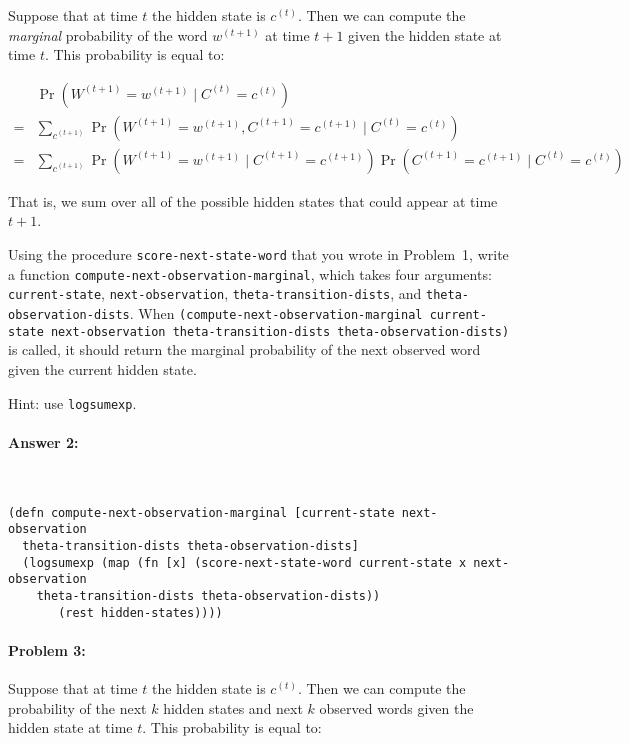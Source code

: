 \documentclass[12pt, letterpaper]{article}
\begin{document}
Suppose that at time $t$ the hidden state is $c^{(t)}$. Then we can
compute the \emph{marginal} probability of the word $w^{(t+1)}$ at
time $t+1$ given the hidden state at time $t$. This probability is
equal to:

\begin{align*}
&\Pr(W^{(t+1)} = w^{(t+1)} \mid C^{(t)} = c^{(t)}) \\ 
=&\sum_{c^{(t+1)}} \Pr(W^{(t+1)} = w^{(t+1)}, C^{(t+1)} =c^{(t+1)} \mid C^{(t)} = c^{(t)})\\
=&\sum_{c^{(t+1)}} \Pr(W^{(t+1)} = w^{(t+1)} \mid C^{(t+1)}=c^{(t+1)}) \Pr(C^{(t+1)} =c^{(t+1)} \mid C^{(t)} = c^{(t)})
\end{align*}

That is, we sum over all of the possible hidden states that could
appear at time $t+1$.

Using the procedure \texttt{score-next-state-word} that you wrote in
Problem~1, write a function
\texttt{compute-next-observation-marginal}, which takes four
arguments: \texttt{current-state}, \texttt{next-observation},
\texttt{theta-transition-dists}, and
\texttt{theta-observation-dists}. When
\texttt{(compute-next-observation-marginal current-state
  next-observation theta-transition-dists theta-observation-dists)} is
called, it should return the marginal probability of the next observed
word given the current hidden state.

Hint: use \texttt{logsumexp}. 

\paragraph{Answer 2:}~\begin{lstlisting}
(defn compute-next-observation-marginal [current-state next-observation 
  theta-transition-dists theta-observation-dists]
  (logsumexp (map (fn [x] (score-next-state-word current-state x next-observation 
    theta-transition-dists theta-observation-dists))
       (rest hidden-states))))
\end{lstlisting}

\hrulefill
\paragraph{Problem 3:}
Suppose that at time $t$ the hidden state is $c^{(t)}$. Then we
can compute the probability of the next $k$ hidden states and next
$k$ observed words given the hidden state at time $t$. This
probability is equal to:
\end{document}
